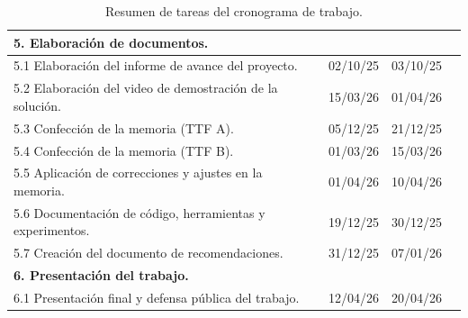 \documentclass[
11pt, %
]{charter}
\begin{document}
\begin{table}[ht]
\begin{tabularx}{\linewidth}{@{}|l|X|X|l|@{}}
		\multicolumn{3}{|l|}{\textbf{5. Elaboración de documentos.}} \\ \hline
		5.1 Elaboración del informe de avance del proyecto. & 02/10/25 & 03/10/25 \\ \hline
		5.2 Elaboración del video de demostración de la solución. & 15/03/26 & 01/04/26 \\ \hline
		5.3 Confección de la memoria (TTF A). & 05/12/25 & 21/12/25 \\ \hline
		5.4 Confección de la memoria (TTF B). & 01/03/26 & 15/03/26 \\ \hline
		5.5 Aplicación de correcciones y ajustes en la memoria. & 01/04/26 & 10/04/26 \\ \hline
		5.6 Documentación de código, herramientas y experimentos. & 19/12/25 & 30/12/25 \\ \hline
		5.7 Creación del documento de recomendaciones. & 31/12/25 & 07/01/26 \\ \hline
		\multicolumn{3}{|l|}{\textbf{6. Presentación del trabajo.}} \\ \hline
		6.1 Presentación final y defensa pública del trabajo. & 12/04/26 & 20/04/26 \\ \hline
	\end{tabularx}
	\caption{Resumen de tareas del cronograma de trabajo.}
	\label{tab:wbs}
\end{table}
\end{document}
